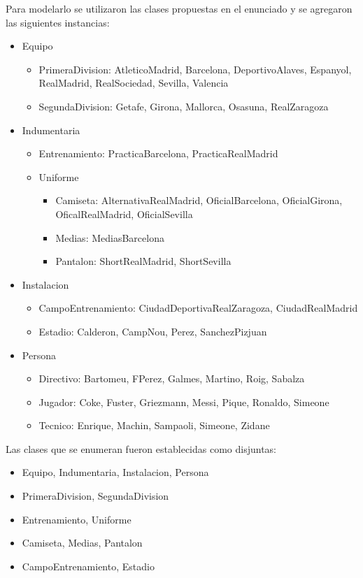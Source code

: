 \documentclass{article}
\begin{document}
Para modelarlo se utilizaron las clases propuestas en el enunciado y se agregaron las siguientes instancias:
\begin{itemize}[itemsep=2pt, topsep=0pt]
 \item Equipo
  \begin{itemize}[itemsep=2pt, topsep=0pt]
   \item PrimeraDivision: AtleticoMadrid, Barcelona, DeportivoAlaves, Espanyol, RealMadrid, RealSociedad, Sevilla, Valencia
   \item SegundaDivision: Getafe, Girona, Mallorca, Osasuna, RealZaragoza
  \end{itemize}
 \item Indumentaria
  \begin{itemize}[itemsep=2pt, topsep=0pt]
   \item Entrenamiento: PracticaBarcelona, PracticaRealMadrid
   \item Uniforme
    \begin{itemize}[itemsep=2pt, topsep=0pt]
     \item Camiseta: AlternativaRealMadrid, OficialBarcelona, OficialGirona, OficalRealMadrid, OficialSevilla 
     \item Medias: MediasBarcelona
     \item Pantalon: ShortRealMadrid, ShortSevilla
    \end{itemize}
  \end{itemize}
 \item Instalacion
  \begin{itemize}[itemsep=2pt, topsep=0pt]
   \item CampoEntrenamiento: CiudadDeportivaRealZaragoza, CiudadRealMadrid
   \item Estadio: Calderon, CampNou, Perez, SanchezPizjuan
  \end{itemize}
 \item Persona
  \begin{itemize}[itemsep=2pt, topsep=0pt]
   \item Directivo: Bartomeu, FPerez, Galmes, Martino, Roig, Sabalza
   \item Jugador: Coke, Fuster, Griezmann, Messi, Pique, Ronaldo, Simeone
   \item Tecnico: Enrique, Machin, Sampaoli, Simeone, Zidane
  \end{itemize}
\end{itemize}

Las clases que se enumeran fueron establecidas como disjuntas:
\begin{itemize}[itemsep=2pt, topsep=0pt]
 \item Equipo, Indumentaria, Instalacion, Persona
 \item PrimeraDivision, SegundaDivision
 \item Entrenamiento, Uniforme
 \item Camiseta, Medias, Pantalon
 \item CampoEntrenamiento, Estadio
\end{itemize}
\end{document}
